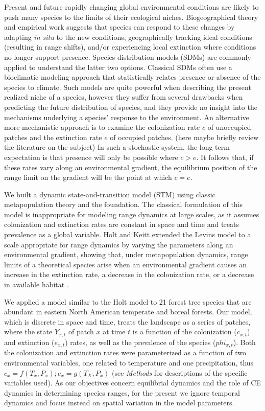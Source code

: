 \documentclass[11pt]{article}
\begin{document}
Present and future rapidly changing global environmental conditions are likely to push many species to the limits of their ecological niches.
Biogeographical theory and empirical work suggests that species can respond to these changes by adapting \emph{in situ} to the new conditions, geographically tracking ideal conditions (resulting in range shifts), and/or experiencing local extinction where conditions no longer support presence.
Species distribution models (SDMs) are commonly-applied to understand the latter two options.
Classical SDMs often use a bioclimatic modeling approach that statistically relates presence or absence of the species to climate.
Such models are quite powerful when describing the present realized niche of a species, however they suffer from several drawbacks when predicting the future distribution of species, and they provide no insight into the mechanisms underlying a species' response to the environment.
An alternative more mechanistic approach is to examine the colonization rate $c$ of unoccupied patches and the extinction rate $e$ of occupied patches.
(here maybe briefly review the literature on the subject)
In such a stochastic system, the long-term expectation is that presence will only be possible where $c > e$.
It follows that, if these rates vary along an environmental gradient, the equilibrium position of the range limit on the gradient will be the point at which $c = e$.

We built a dynamic state-and-transition model (STM) using classic metapopulation theory \citep{Levins1969, Nee1992} and the foundation.
The classical formulation of this model is inappropriate for modeling range dynamics at large scales, as it assumes colonization and extinction rates are constant in space and time and treats prevalence as a global variable.
Holt and Keitt extended the Levins model to a scale appropriate for range dynamics by varying the parameters along an environmental gradient, showing that, under metapopulation dynamics, range limits of a theoretical species arise when an environmental gradient causes an increase in the extinction rate, a decrease in the colonization rate, or a decrease in available habitat \cite{Holt2000}.

We applied a model similar to the Holt model \cite{Holt2000} to 21 forest tree species that are abundant in eastern North American temperate and boreal forests.
Our model, which is discrete in space and time, treats the landscape as a series of patches, where the state $Y_{x,t}$ of patch $x$ at time $t$ is a function of the colonization ($c_{x,t}$) and extinction ($e_{x,t}$) rates, as well as the prevalence of the species ($phi_{x,t}$).
Both the colonization and extinction rates were parameterized as a function of two environmental variables, one related to temperature and one precipitation, thus $c_x = f(T_x, P_x); e_x = g(T_X, P_x)$ (see \emph{Methods} for descriptions of the specific variables used).
As our objectives concern equilibrial dynamics and the role of CE dynamics in determining species ranges, for the present we ignore temporal dynamics and focus instead on spatial variation in the model parameters.
\end{document}
